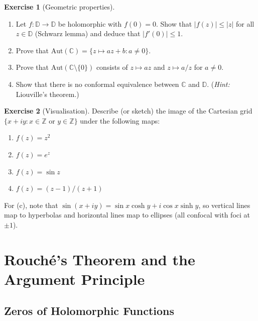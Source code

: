 \documentclass[12pt,a4paper,openany]{book}
\theoremstyle{definition}
\newtheorem{exercise}{Exercise}[chapter]
\theoremstyle{plain}
\theoremstyle{remark}
\newcommand{\C}{\mathbb{C}}
\newcommand{\Z}{\mathbb{Z}}
\newcommand{\D}{\mathbb{D}}
\newcommand{\abs}[1]{\left|#1\right|}
\begin{document}
\begin{exercise}[Geometric properties]\label{exer:geometric}
\begin{enumerate}[label=(\alph*)]
  \item Let $f\colon\D\to\D$ be holomorphic with $f(0)=0$.
        Show that $\abs{f(z)}\leq\abs{z}$ for all $z\in\D$ (Schwarz
        lemma) and deduce that $\abs{f'(0)}\leq 1$.
  \item Prove that $\mathrm{Aut}(\C)=\{z\mapsto az+b:a\neq 0\}$.
  \item Prove that $\mathrm{Aut}(\C\setminus\{0\})$ consists of
        $z\mapsto az$ and $z\mapsto a/z$ for $a\neq 0$.
  \item Show that there is no conformal equivalence between
        $\C$ and $\D$.  (\emph{Hint:} Liouville's theorem.)
\end{enumerate}
\end{exercise}

\begin{exercise}[Visualisation]\label{exer:visualisation}
Describe (or sketch) the image of the Cartesian grid
$\{x+iy:x\in\Z\text{ or }y\in\Z\}$ under the following maps:
\begin{enumerate}[label=(\alph*)]
  \item $f(z)=z^2$
  \item $f(z)=e^z$
  \item $f(z)=\sin z$
  \item $f(z)=(z-1)/(z+1)$
\end{enumerate}
For (c), note that $\sin(x+iy)=\sin x\cosh y+i\cos x\sinh y$, so
vertical lines map to hyperbolas and horizontal lines map to ellipses
(all confocal with foci at $\pm 1$).
\end{exercise}

\chapter{Rouch\'{e}'s Theorem and the Argument Principle}\label{ch:rouche-argument}

\section{Zeros of Holomorphic Functions}\label{sec:zeros-holo}
\end{document}
